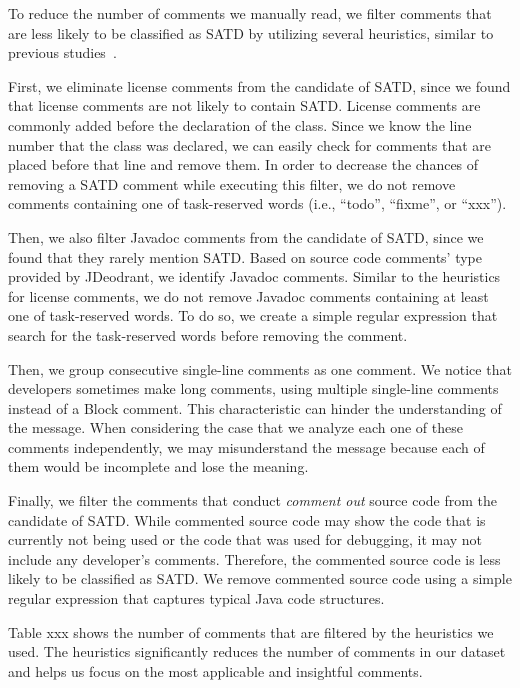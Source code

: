 To reduce the number of comments we manually read, we filter comments that are less likely to be classified as SATD by utilizing several heuristics, similar to previous studies~\cite{Maldonado2015MTD}.

First, we eliminate license comments from the candidate of SATD, since we found that license comments are not likely to contain SATD. License comments are commonly added before the declaration of the class. Since we know the line number that the class was declared, we can easily check for comments that are placed before that line and remove them. In order to decrease the chances of removing a SATD comment while executing this filter, we do not remove comments containing one of task-reserved words (i.e., “todo”, “fixme”, or “xxx”).

Then, we also filter Javadoc comments from the candidate of SATD, since we found that they rarely mention SATD. Based on source code comments' type provided by JDeodrant, we identify Javadoc comments. Similar to the heuristics for license comments, we do not remove Javadoc comments containing at least one of task-reserved words. To do so, we create a simple regular expression that search for the task-reserved words before removing the comment.

Then, we group consecutive single-line comments as one comment. We notice that developers sometimes make long comments, using multiple single-line comments instead of a Block comment. This characteristic can hinder the understanding of the message. When considering the case that we analyze each one of these comments independently, we may misunderstand the message because each of them would be incomplete and lose the meaning.

Finally, we filter the comments that conduct {\it comment out} source code from the candidate of SATD. While commented source code may show the code that is currently not being used or the code that was used for debugging, it may not include any developer's comments. Therefore, the commented source code is less likely to be classified as SATD. We remove commented source code using a simple regular expression that captures typical Java code structures.

Table xxx shows the number of comments that are filtered by the heuristics we used. The heuristics significantly reduces the number of comments in our dataset and helps us focus on the most applicable and insightful comments. 


